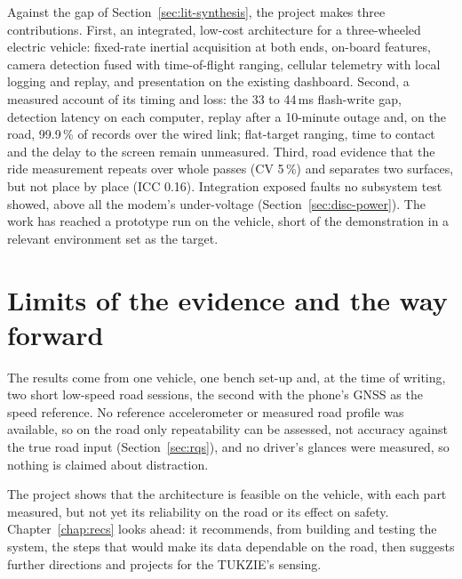 Against the gap of Section~\ref{sec:lit-synthesis}, the project makes three contributions. First, an integrated, low-cost architecture for a three-wheeled electric vehicle: fixed-rate inertial acquisition at both ends, on-board features, camera detection fused with time-of-flight ranging, cellular telemetry with local logging and replay, and presentation on the existing dashboard. Second, a measured account of its timing and loss: the 33 to 44\,ms flash-write gap, detection latency on each computer, replay after a 10-minute outage and, on the road, 99.9\,\% of records over the wired link; flat-target ranging, time to contact and the delay to the screen remain unmeasured. Third, road evidence that the ride measurement repeats over whole passes (CV 5\,\%) and separates two surfaces, but not place by place (ICC 0.16). Integration exposed faults no subsystem test showed, above all the modem's under-voltage (Section~\ref{sec:disc-power}). The work has reached a prototype run on the vehicle, short of the demonstration in a relevant environment set as the target. 

\section{Limits of the evidence and the way forward}
\label{sec:conc-limits}

The results come from one vehicle, one bench set-up and, at the time of writing, two short low-speed road sessions, the second with the phone's GNSS as the speed reference. No reference accelerometer or measured road profile was available, so on the road only repeatability can be assessed, not accuracy against the true road input (Section~\ref{sec:rqs}), and no driver's glances were measured, so nothing is claimed about distraction.

The project shows that the architecture is feasible on the vehicle, with each part measured, but not yet its reliability on the road or its effect on safety. Chapter~\ref{chap:recs} looks ahead: it recommends, from building and testing the system, the steps that would make its data dependable on the road, then suggests further directions and projects for the TUKZIE's sensing.
